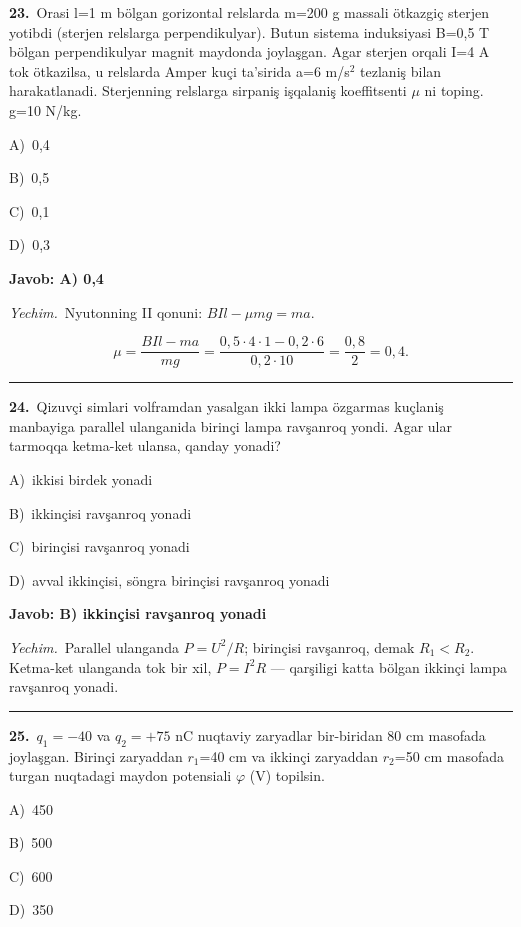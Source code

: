 \documentclass[11pt,a4paper]{article}
\newcommand{\opt}[2]{\hspace*{4mm}#1)\ #2\par}
\begin{document}
\noindent\begin{minipage}{\linewidth}
\textbf{23.}\ Orasi l=1 m bölgan gorizontal relslarda m=200 g massali ötkazgiç sterjen yotibdi (sterjen relslarga perpendikulyar). Butun sistema induksiyasi B=0,5 T bölgan perpendikulyar magnit maydonda joylaşgan. Agar sterjen orqali I=4 A tok ötkazilsa, u relslarda Amper kuçi ta’sirida a=6 m/s$^{2}$ tezlaniş bilan harakatlanadi. Sterjenning relslarga sirpaniş işqalaniş koeffitsenti $\mu$ ni toping. g=10 N/kg.\par\smallskip
\opt{A}{0,4}
\opt{B}{0,5}
\opt{C}{0,1}
\opt{D}{0,3}
\end{minipage}\vspace{2pt}\par
\noindent\colorbox{gray!12}{\parbox{\dimexpr\linewidth-2\fboxsep}{\textbf{Javob: A) 0,4}}}\par\smallskip
\noindent\textit{Yechim.}\ Nyutonning II qonuni: $BIl-\mu mg=ma$.\par
\[\mu=\frac{BIl-ma}{mg}=\frac{0{,}5\cdot4\cdot1-0{,}2\cdot6}{0{,}2\cdot10}=\frac{0{,}8}{2}=0{,}4.\]\par\medskip\hrule\medskip
{}\noindent\begin{minipage}{\linewidth}
\textbf{24.}\ Qizuvçi simlari volframdan yasalgan ikki lampa özgarmas kuçlaniş manbayiga parallel ulanganida birinçi lampa ravşanroq yondi. Agar ular tarmoqqa ketma-ket ulansa, qanday yonadi?\par\smallskip
\opt{A}{ikkisi birdek yonadi}
\opt{B}{ikkinçisi ravşanroq yonadi}
\opt{C}{birinçisi ravşanroq yonadi}
\opt{D}{avval ikkinçisi, söngra birinçisi ravşanroq yonadi}
\end{minipage}\vspace{2pt}\par
\noindent\colorbox{gray!12}{\parbox{\dimexpr\linewidth-2\fboxsep}{\textbf{Javob: B) ikkinçisi ravşanroq yonadi}}}\par\smallskip
\noindent\textit{Yechim.}\ Parallel ulanganda $P=U^2/R$; birinçisi ravşanroq, demak $R_1<R_2$. Ketma-ket ulanganda tok bir xil, $P=I^2R$ — qarşiligi katta bölgan ikkinçi lampa ravşanroq yonadi.\par\par\medskip\hrule\medskip
{}\noindent\begin{minipage}{\linewidth}
\textbf{25.}\ $q_1=-40$ va $q_2=+75$ nC nuqtaviy zaryadlar bir-biridan 80 cm masofada joylaşgan. Birinçi zaryaddan $r_1$=40 cm va ikkinçi zaryaddan $r_2$=50 cm masofada turgan nuqtadagi maydon potensiali $\varphi$ (V) topilsin.\par\smallskip
\opt{A}{450}
\opt{B}{500}
\opt{C}{600}
\opt{D}{350}
\end{minipage}\vspace{2pt}\par
\end{document}
